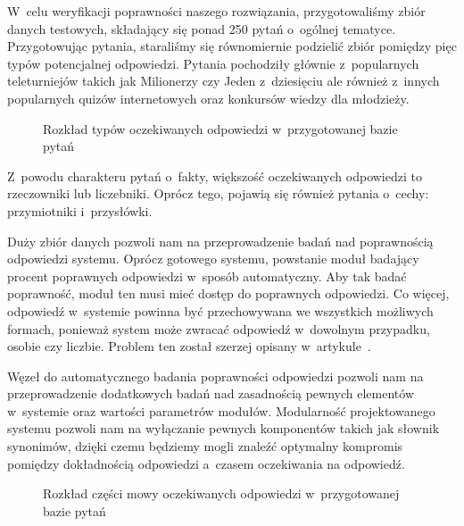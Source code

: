 W~celu weryfikacji poprawności naszego rozwiązania, przygotowaliśmy zbiór danych testowych, składający się ponad 250 pytań o~ogólnej tematyce. Przygotowując pytania, staraliśmy się równomiernie podzielić zbiór pomiędzy pięc typów potencjalnej odpowiedzi. Pytania pochodziły głównie z~popularnych teleturniejów takich jak Milionerzy czy Jeden z~dziesięciu ale również z~innych popularnych quizów internetowych oraz konkursów wiedzy dla młodzieży.

\begin{figure}[h!]
    \label{fig:rozklad-typow-odpowiedzi}  
    \caption{Rozkład typów oczekiwanych odpowiedzi w~przygotowanej bazie pytań}
\end{figure}

Z~powodu charakteru pytań o~fakty, większość oczekiwanych odpowiedzi to rzeczowniki lub liczebniki. Oprócz tego, pojawią się również pytania o~cechy: przymiotniki i~przysłówki.

Duży zbiór danych pozwoli nam na przeprowadzenie badań nad poprawnością odpowiedzi systemu. Oprócz gotowego systemu, powstanie moduł badający procent poprawnych odpowiedzi w~sposób automatyczny. Aby tak badać poprawność, moduł ten musi mieć dostęp do poprawnych odpowiedzi. Co więcej, odpowiedź w~systemie powinna być przechowywana we wszystkich możliwych formach, ponieważ system może zwracać odpowiedź w~dowolnym przypadku, osobie czy liczbie. Problem ten został szerzej opisany w~artykule~\cite{brill2002analysis}.

Węzeł do automatycznego badania poprawności odpowiedzi pozwoli nam na przeprowadzenie dodatkowych badań nad zasadnością pewnych elementów w~systemie oraz wartości parametrów modułów. Modularność projektowanego systemu pozwoli nam na wyłączanie pewnych komponentów takich jak słownik synonimów, dzięki czemu będziemy mogli znaleźć optymalny kompromis pomiędzy dokładnością odpowiedzi a~czasem oczekiwania na odpowiedź.

\begin{figure}[h!]
    \label{fig:rozklad-typow-odpowiedzi}  
    \caption{Rozkład części mowy oczekiwanych odpowiedzi w~przygotowanej bazie pytań}
\end{figure}